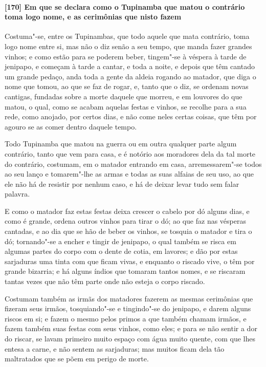 \paragraph{[170] Em que se declara como o Tupinamba que matou o contrário toma logo nome, e
as cerimônias que nisto fazem}\quad
Costuma"-se, entre os Tupinambas, que todo aquele que mata contrário, toma logo nome entre
si, mas não o diz senão a seu tempo, que manda fazer grandes vinhos; e como estão para se
poderem beber, tingem"-se à véspera à tarde de jenipapo, e começam à tarde a cantar, e toda
a noite, e depois que têm cantado um grande pedaço, anda toda a gente da aldeia rogando ao
matador, que diga o nome que tomou, ao que se faz de rogar, e, tanto que o diz, se ordenam
novas cantigas, fundadas sobre a morte daquele que morreu, e em louvores do que matou, o
qual, como se acabam aquelas festas e vinhos, se recolhe para a sua rede, como anojado,
por certos dias, e não come neles certas coisas, que têm por agouro se as comer dentro
daquele tempo.

Todo Tupinamba que matou na guerra ou em outra qualquer parte algum contrário, tanto que
vem para casa, e é notório aos moradores dela da tal morte do contrário, costumam, em o
matador entrando em casa, arremessarem"-se todos ao seu lanço e tomarem"-lhe as armas e
todas as suas alfaias de seu uso, ao que ele não há de resistir por nenhum caso, e há de
deixar levar tudo sem falar palavra.

E como o matador faz estas festas deixa crescer o cabelo por dó alguns dias, e como é
grande, ordena outros vinhos para tirar o dó; ao que faz nas vésperas cantadas, e ao dia
que se hão de beber os vinhos, se tosquia o matador e tira o dó; tornando"-se a encher e
tingir de jenipapo, o qual também se risca em algumas partes do corpo com o dente de
cotia, em lavores; e dão por estas sarjaduras uma tinta com que ficam vivas, e enquanto o
riscado vive, o têm por grande bizarria; e há alguns índios que tomaram tantos nomes, e se
riscaram tantas vezes que não têm parte onde não esteja o corpo riscado.

Costumam também as irmãs dos matadores fazerem as mesmas cerimônias que fizeram seus
irmãos, tosquiando"-se e tingindo"-se do jenipapo, e darem alguns riscos em si; e fazem o
mesmo pelos primos a que também chamam irmãos, e fazem também suas festas com seus vinhos,
como eles; e para se não sentir a dor do riscar, se lavam primeiro muito espaço com água
muito quente, com que lhes entesa a carne, e não sentem as sarjaduras; mas muitos ficam
dela tão maltratados que se põem em perigo de morte.

